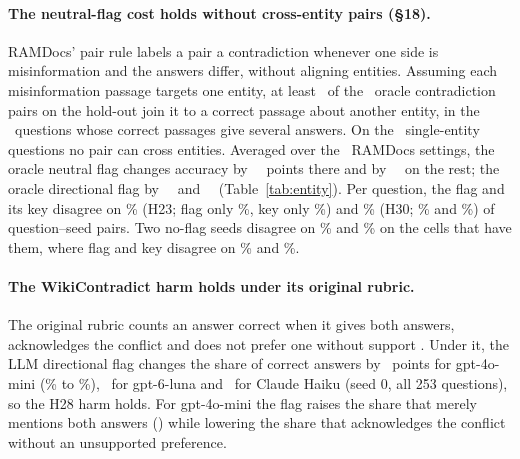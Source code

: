 \paragraph{The neutral-flag cost holds without cross-entity pairs (\S18).} RAMDocs' pair rule labels a pair a
contradiction whenever one side is misinformation and the answers differ, without aligning entities. Assuming each
misinformation passage targets one entity, at least \pairCrossLb\ of the \pairContraN\ oracle contradiction pairs on the
hold-out join it to a correct passage about another entity, in the \pairMultiN\ questions whose correct passages give
several answers. On the \pairSingleN\ single-entity questions no pair can cross entities. Averaged over the \entNeuK\
RAMDocs settings, the oracle neutral flag changes accuracy by \entNeuSingle\ \entNeuSingleCI\ points there and by
\entNeuMulti\ \entNeuMultiCI\ on the rest; the oracle directional flag by \entDirSingle\ \entDirSingleCI\ and
\entDirMulti\ \entDirMultiCI\ (Table~\ref{tab:entity}). Per question, the flag and its key disagree on \agrTwentyThreeDis\% (H23; flag only \agrTwentyThreeFlagOnly\%,
key only \agrTwentyThreeKeyOnly\%) and \agrThirtyDis\% (H30; \agrThirtyFlagOnly\% and \agrThirtyKeyOnly\%) of
question--seed pairs. Two no-flag seeds disagree on \agrTwentyThreeNull\% and \agrThirtyNull\% on the cells that have
them, where flag and key disagree on \agrTwentyThreeDisMatched\% and \agrThirtyDisMatched\%.

\paragraph{The WikiContradict harm holds under its original rubric.} The original rubric counts an answer correct when it gives
both answers, acknowledges the conflict and does not prefer one without support
\citep[\S3.4]{hou2024wikicontradict}. Under it, the LLM directional flag changes the share of correct answers
by \wikiOrigMiniEff\ points for gpt-4o-mini (\wikiOrigMiniPlain\% to \wikiOrigMiniDir\%), \wikiOrigLunaEff\ for
gpt-6-luna and \wikiOrigHaikuEff\ for Claude Haiku (seed 0, all 253 questions), so the H28 harm holds. For gpt-4o-mini the flag raises the share that merely mentions both answers (\wikiBothMiniEff) while
lowering the share that acknowledges the conflict without an unsupported preference.

